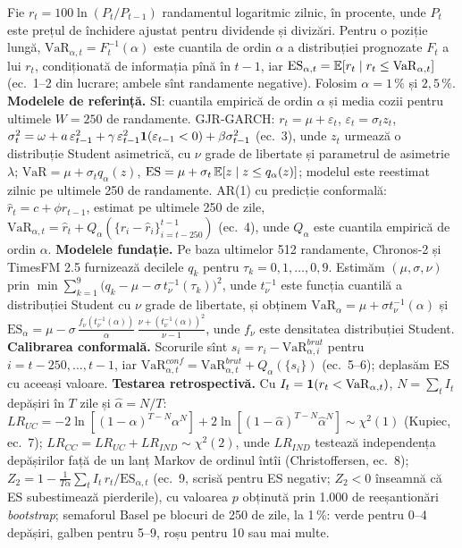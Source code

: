{Fie $r_t=100\ln(P_t/P_{t-1})$ randamentul logaritmic zilnic, în procente, unde $P_t$ este prețul de închidere ajustat pentru dividende și divizări. Pentru o poziție lungă, $\mathrm{VaR}_{\alpha,t}=F_t^{-1}(\alpha)$ este cuantila de ordin $\alpha$ a distribuției prognozate $F_t$ a lui $r_t$, condiționată de informația pînă în $t-1$, iar $\mathrm{ES}_{\alpha,t}=\mathbb{E}[r_t\mid r_t\le\mathrm{VaR}_{\alpha,t}]$ (ec.~1--2 din lucrare; ambele sînt randamente negative). Folosim $\alpha=1\,\%$ și $2{,}5\,\%$.
\textbf{Modelele de referință.} SI: cuantila empirică de ordin $\alpha$ și media cozii pentru ultimele $W=250$ de randamente. GJR-GARCH: $r_t=\mu+\varepsilon_t$, $\varepsilon_t=\sigma_t z_t$, $\sigma_t^2=\omega+a\,\varepsilon_{t-1}^2+\gamma\,\varepsilon_{t-1}^2\mathbf{1}(\varepsilon_{t-1}<0)+\beta\sigma_{t-1}^2$ (ec.~3), unde $z_t$ urmează o distribuție Student asimetrică, cu $\nu$ grade de libertate și parametrul de asimetrie $\lambda$; $\mathrm{VaR}=\mu+\sigma_t q_\alpha(z)$, $\mathrm{ES}=\mu+\sigma_t\,\mathbb{E}[z\mid z\le q_\alpha(z)]$; modelul este reestimat zilnic pe ultimele 250 de randamente. AR(1) cu predicție conformală: $\hat r_t=c+\phi r_{t-1}$, estimat pe ultimele 250 de zile, $\mathrm{VaR}_{\alpha,t}=\hat r_t+Q_\alpha(\{r_i-\hat r_i\}_{i=t-250}^{t-1})$ (ec.~4), unde $Q_\alpha$ este cuantila empirică de ordin $\alpha$.
\textbf{Modelele fundație.} Pe baza ultimelor 512 randamente, Chronos-2 și TimesFM 2.5 furnizează decilele $q_k$ pentru $\tau_k=0{,}1,\dots,0{,}9$. Estimăm $(\mu,\sigma,\nu)$ prin $\min\sum_{k=1}^{9}\big(q_k-\mu-\sigma\,t_\nu^{-1}(\tau_k)\big)^2$, unde $t_\nu^{-1}$ este funcția cuantilă a distribuției Student cu $\nu$ grade de libertate, și obținem $\mathrm{VaR}_\alpha=\mu+\sigma t_\nu^{-1}(\alpha)$ și $\mathrm{ES}_\alpha=\mu-\sigma\,\frac{f_\nu(t_\nu^{-1}(\alpha))}{\alpha}\,\frac{\nu+(t_\nu^{-1}(\alpha))^2}{\nu-1}$, unde $f_\nu$ este densitatea distribuției Student.
\textbf{Calibrarea conformală.} Scorurile sînt $s_i=r_i-\mathrm{VaR}^{brut}_{\alpha,i}$ pentru $i=t-250,\dots,t-1$, iar $\mathrm{VaR}^{conf}_{\alpha,t}=\mathrm{VaR}^{brut}_{\alpha,t}+Q_\alpha(\{s_i\})$ (ec.~5--6); deplasăm ES cu aceeași valoare.
\textbf{Testarea retrospectivă.} Cu $I_t=\mathbf{1}(r_t<\mathrm{VaR}_{\alpha,t})$, $N=\sum_t I_t$ depășiri în $T$ zile și $\hat\alpha=N/T$: $LR_{UC}=-2\ln[(1-\alpha)^{T-N}\alpha^N]+2\ln[(1-\hat\alpha)^{T-N}\hat\alpha^N]\sim\chi^2(1)$ (Kupiec, ec.~7); $LR_{CC}=LR_{UC}+LR_{IND}\sim\chi^2(2)$, unde $LR_{IND}$ testează independența depășirilor față de un lanț Markov de ordinul întîi (Christoffersen, ec.~8);
$Z_2=1-\frac{1}{T\alpha}\sum_t I_t\,r_t/\mathrm{ES}_{\alpha,t}$ (ec.~9, scrisă pentru ES negativ; $Z_2<0$ înseamnă că ES subestimează pierderile), cu valoarea $p$ obținută prin 1.000 de reeșantionări \emph{bootstrap}; semaforul Basel pe blocuri de 250 de zile, la 1\,\%: verde pentru 0--4 depășiri, galben pentru 5--9, roșu pentru 10 sau mai multe.
}
